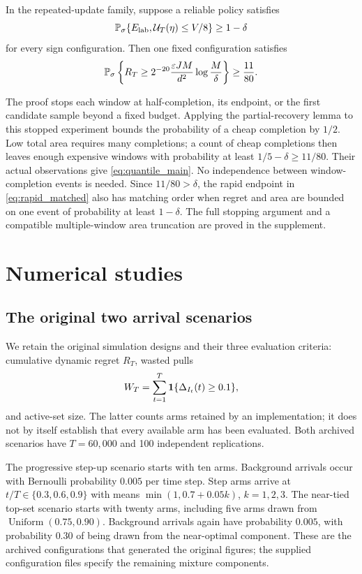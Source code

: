 \documentclass[11pt]{article}
\begin{document}
\begin{theorem}
\label{thm:quantile_main}
In the repeated-update family, suppose a reliable policy satisfies
\[
 \mathbb P_\sigma\{E_{\rm lab},\mathcal U_T(\eta)\le V/8\}\ge1-\delta
\]
for every sign configuration. Then one fixed configuration satisfies
\begin{equation}
 \mathbb P_\sigma\left\{R_T\ge
 2^{-20}\frac{\varepsilon JM}{d^2}\log\frac M\delta\right\}
 \ge\frac{11}{80}.
 \label{eq:quantile_main}
\end{equation}
\end{theorem}

The proof stops each window at half-completion, its endpoint, or the first
candidate sample beyond a fixed budget. Applying the partial-recovery lemma
to this stopped experiment bounds the probability of a cheap completion by
$1/2$. Low total area requires many completions; a count of cheap completions
then leaves enough expensive windows with probability at least
$1/5-\delta\ge11/80$. Their actual observations give
\eqref{eq:quantile_main}. No independence between window-completion events is
needed. Since $11/80>\delta$, the rapid endpoint in
\eqref{eq:rapid_matched} also has matching order when regret and area are
bounded on one event of probability at least $1-\delta$. The full stopping
argument and a compatible multiple-window area truncation are proved in the
supplement.

\section{Numerical studies}
\label{sec:numerical}

\subsection{The original two arrival scenarios}

We retain the original simulation designs and their three evaluation
criteria: cumulative dynamic regret $R_T$, wasted pulls
\[
 W_T=\sum_{t=1}^T\mathbf 1\{\Delta_{I_t}(t)\ge0.1\},
\]
and active-set size. The latter counts arms retained by an implementation;
it does not by itself establish that every available arm has been evaluated.
Both archived scenarios have $T=60{,}000$ and 100 independent replications.

The progressive step-up scenario starts with ten arms. Background arrivals
occur with Bernoulli probability $0.005$ per time step. Step arms arrive at
$t/T\in\{0.3,0.6,0.9\}$ with means
$\min(1,0.7+0.05k)$, $k=1,2,3$. The near-tied top-set scenario starts with
twenty arms, including five arms drawn from $\operatorname{Uniform}(0.75,0.90)$.
Background arrivals again have probability $0.005$, with probability $0.30$
of being drawn from the near-optimal component. These are the archived
configurations that generated the original figures; the supplied configuration
files specify the remaining mixture components.
\end{document}
